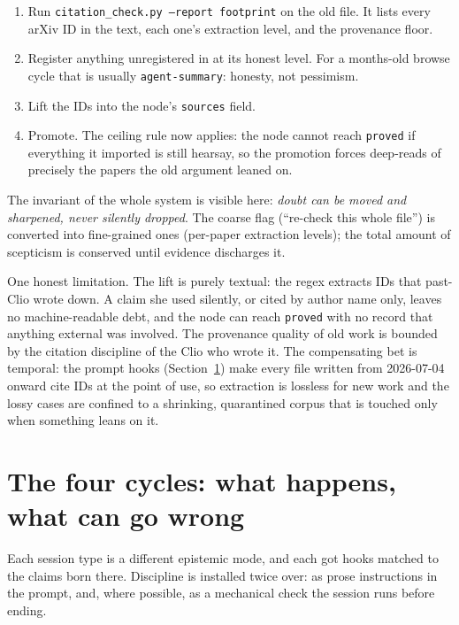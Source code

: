 \documentclass[11pt,a4paper]{article}
\newcommand{\level}[1]{\texttt{#1}}
\begin{document}
\begin{enumerate}[nosep]
  \item Run \texttt{citation\_check.py --report footprint} on the old file.
    It lists every arXiv ID in the text, each one's extraction level, and
    the provenance floor.
  \item Register anything unregistered in  at its honest
    level. For a months-old browse cycle that is usually
    \level{agent-summary}: honesty, not pessimism.
  \item Lift the IDs into the node's \texttt{sources} field.
  \item Promote. The ceiling rule now applies: the node cannot reach
    \level{proved} if everything it imported is still hearsay, so the
    promotion forces deep-reads of precisely the papers the old argument
    leaned on.
\end{enumerate}

The invariant of the whole system is visible here: \emph{doubt can be moved
and sharpened, never silently dropped}. The coarse flag (``re-check this
whole file'') is converted into fine-grained ones (per-paper extraction
levels); the total amount of scepticism is conserved until evidence
discharges it.

One honest limitation. The lift is purely textual: the regex extracts IDs
that past-Clio wrote down. A claim she used silently, or cited by author
name only, leaves no machine-readable debt, and the node can reach
\level{proved} with no record that anything external was involved. The
provenance quality of old work is bounded by the citation discipline of the
Clio who wrote it. The compensating bet is temporal: the prompt hooks
(Section~\ref{sec:cycles}) make every file written from 2026-07-04 onward
cite IDs at the point of use, so extraction is lossless for new work and the
lossy cases are confined to a shrinking, quarantined corpus that is touched
only when something leans on it.

\section{The four cycles: what happens, what can go wrong}
\label{sec:cycles}

Each session type is a different epistemic mode, and each got hooks matched
to the claims born there. Discipline is installed twice over: as prose
instructions in the prompt, and, where possible, as a mechanical check the
session runs before ending.
\end{document}
